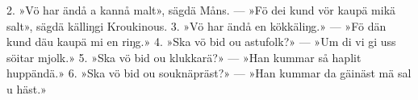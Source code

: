 2.  »Vö har ändå a kannå malt», sägdä Måns. —
    »Fö dei kund vör kaupä mikä salt», sägdä källiŋgi Kroukinous.
3.  »Vö har ändå en kökkäliŋg.» —
    »Fö dän kund däu kaupä mi en riŋg.»
4.  »Ska vö bid ou astufolk?» —
    »Um di vi gi uss söitar mjolk.»
5.  »Ska vö bid ou klukkarä?» —
    »Han kummar så haplit huppändä.»
6.  »Ska vö bid ou souknäpräst?» —
    »Han kummar da gäinäst mä sal u häst.»
